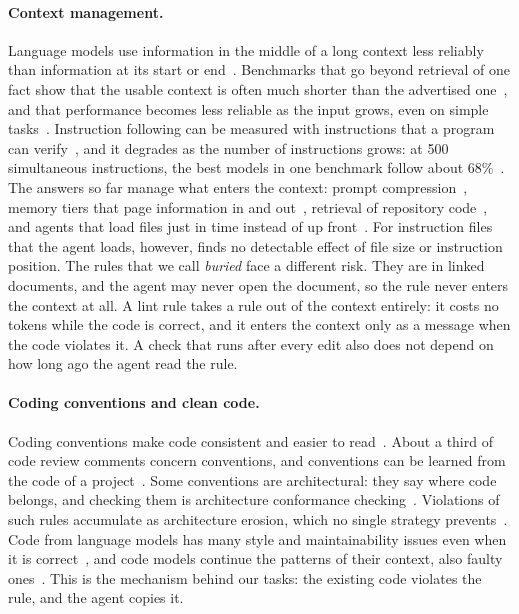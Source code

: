 \documentclass[pdflatex,sn-mathphys-num]{sn-jnl}
\begin{document}
\paragraph{Context management.}
Language models use information in the middle of a long context less reliably than information at its start or end~\cite{liu2024lost}.
Benchmarks that go beyond retrieval of one fact show that the usable context is often much shorter than the advertised one~\cite{hsieh2024ruler}, and that performance becomes less reliable as the input grows, even on simple tasks~\cite{hong2025contextrot}.
Instruction following can be measured with instructions that a program can verify~\cite{zhou2023ifeval}, and it degrades as the number of instructions grows: at 500 simultaneous instructions, the best models in one benchmark follow about 68\%~\cite{jaroslawicz2025ifscale}.
The answers so far manage what enters the context: prompt compression~\cite{jiang2023llmlingua}, memory tiers that page information in and out~\cite{packer2023memgpt}, retrieval of repository code~\cite{zhang2023repocoder}, and agents that load files just in time instead of up front~\cite{anthropic2025context}.
For instruction files that the agent loads, however, \citet{mcmillan2026adherence} finds no detectable effect of file size or instruction position.
The rules that we call \emph{buried} face a different risk.
They are in linked documents, and the agent may never open the document, so the rule never enters the context at all.
A lint rule takes a rule out of the context entirely: it costs no tokens while the code is correct, and it enters the context only as a message when the code violates it.
A check that runs after every edit also does not depend on how long ago the agent read the rule.

\paragraph{Coding conventions and clean code.}
Coding conventions make code consistent and easier to read~\cite{martin2008cleancode}.
About a third of code review comments concern conventions, and conventions can be learned from the code of a project~\cite{allamanis2014naturalize}.
Some conventions are architectural: they say where code belongs, and checking them is architecture conformance checking~\cite{passos2010conformance}.
Violations of such rules accumulate as architecture erosion, which no single strategy prevents~\cite{desilva2012erosion}.
Code from language models has many style and maintainability issues even when it is correct~\cite{liu2024refining}, and code models continue the patterns of their context, also faulty ones~\cite{dinh2023buggy}.
This is the mechanism behind our tasks: the existing code violates the rule, and the agent copies it.
\end{document}
